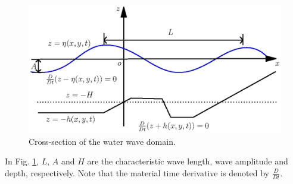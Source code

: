 
\begin{figure}[!htb]
{\centering
\includegraphics[width=12cm]{chapters/lopes/eps/graph.eps}
\caption{Cross-section of the water wave domain.}\label{fig::schematic}
\par}
\end{figure} 
In Fig. \ref{fig::schematic}, \(L\), \(A\) and \(H\) are
the characteristic wave length, wave amplitude and
depth, respectively. Note that the material time derivative is
denoted by \(\frac{D}{D t}\). 
  
